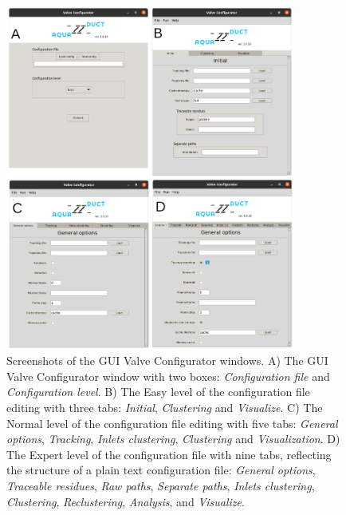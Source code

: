 \documentclass[9pt,tutorial]{livecoms}
\begin{document}
\begin{figure}[ht!]
\centering
\includegraphics[width=0.85\textwidth]{GUI.png}
\caption{Screenshots of the GUI Valve Configurator windows. A) The GUI Valve Configurator window with two boxes: \textit{Configuration file} and \textit{Configuration level}. B) The Easy level of the configuration file editing with three tabs: \textit{Initial}, \textit{Clustering} and \textit{Visualize}. C) The Normal level of the configuration file editing with five tabs: \textit{General options}, \textit{Tracking}, \textit{Inlets clustering}, \textit{Clustering} and \textit{Visualization}. D) The Expert level of the configuration file with nine tabs, reflecting the structure of a plain text configuration file: \textit{General options}, \textit{Traceable residues}, \textit{Raw paths}, \textit{Separate paths}, \textit{Inlets clustering}, \textit{Clustering}, \textit{Reclustering}, \textit{Analysis}, and \textit{Visualize}.}
\label{GUI}
\end{figure}
\end{document}
